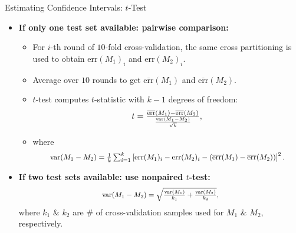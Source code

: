 \begin{frame}{Estimating Confidence Intervals: $t$-Test}
	\begin{itemize}
		\item \textbf{If only one test set available: pairwise comparison:}
		      \begin{itemize}
			      \item For $i$-th round of $10$-fold cross-validation, the same cross partitioning is used to obtain $\text{err}(M_1)_i$ and $\text{err}(M_2)_i$.
			      \item Average over $10$ rounds to get $\overline{\text{err}}(M_1)$ and $\overline{\text{err}}(M_2)$.
			      \item $t$-test computes $t$-statistic with $k-1$ degrees of freedom:
			            \begin{align*}
				            \resizebox{3cm}{!}{%
					            $t = \frac{\overline{\text{err}}(M_1)- \overline{\text{err}}(M_2)}{\frac{\text{var}(M_1-M_2)}{\sqrt{k}}},$}
			            \end{align*}
			      \item where
			            \begin{align*}
				            \resizebox{10cm}{!}{%
					            $\text{var}(M_1-M_2) = \frac{1}{k} \sum_{i=1}^{k} \left[ \text{err}(M_1)_i - \text{err}(M_2)_i - (\overline{\text{err}}(M_1) - \overline{\text{err}}(M_2))\right]^2.$}
			            \end{align*}
		      \end{itemize}
		\item \textbf{If two test sets available: use nonpaired $t$-test:}
		      \begin{align*}
			      \resizebox{5cm}{!}{%
				      $\text{var}(M_1-M_2) = \sqrt{\frac{\text{var}(M_1)}{k_1} + \frac{\text{var}(M_2)}{k_2}},$}
		      \end{align*}
		      where $k_1$ \& $k_2$ are $\#$ of cross-validation samples used for $M_1$ \& $M_2$, respectively.
	\end{itemize}
\end{frame}

